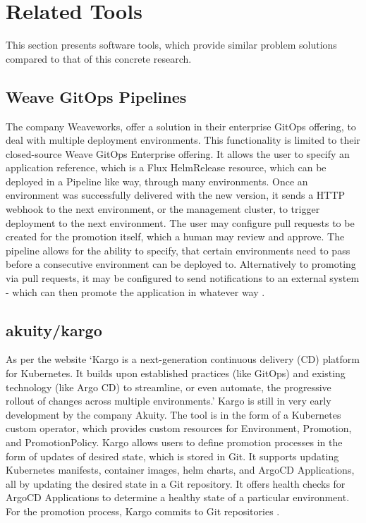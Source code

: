 \section{Related Tools}

This section presents software tools,
which provide similar problem solutions compared to that of
this concrete research.

\subsection*{Weave GitOps Pipelines}

The company Weaveworks,
offer a solution in their enterprise GitOps offering,
to deal with multiple deployment environments.
This functionality is limited to their closed-source Weave GitOps Enterprise offering.
It allows the user to specify an application reference,
which is a Flux HelmRelease resource,
which can be deployed in a Pipeline like way,
through many environments.
Once an environment was successfully delivered with the new version,
it sends a HTTP webhook to the next environment, or the management cluster,
to trigger deployment to the next environment.
The user may configure pull requests to be created for the promotion itself,
which a human may review and approve.
The pipeline allows for the ability to specify, that certain environments need
to pass before a consecutive environment can be deployed to.
Alternatively to promoting via pull requests,
it may be configured to send notifications
to an external system -
which can then promote the application in whatever way
\autocite{weaveGitOpsPipelines}.

\subsection*{akuity/kargo}

As per the website
\enquote*{Kargo is a next-generation continuous delivery (CD) platform for Kubernetes. It builds upon established practices (like GitOps) and existing technology (like Argo CD) to streamline, or even automate, the progressive rollout of changes across multiple environments.}
\autocite{kargoAkuityWebsite}
Kargo is still in very early development by the company Akuity.
The tool is in the form of a Kubernetes custom operator, which provides custom resources
for Environment, Promotion, and PromotionPolicy.
Kargo allows users to define promotion processes in the form of updates of desired state,
which is stored in Git. It supports updating Kubernetes manifests, container images, helm charts,
and ArgoCD Applications, all by updating the desired state in a Git repository.
It offers health checks for ArgoCD Applications to determine a healthy state of a particular environment.
For the promotion process, Kargo commits to Git repositories
\autocite{kargoAkuityWebsite}.

